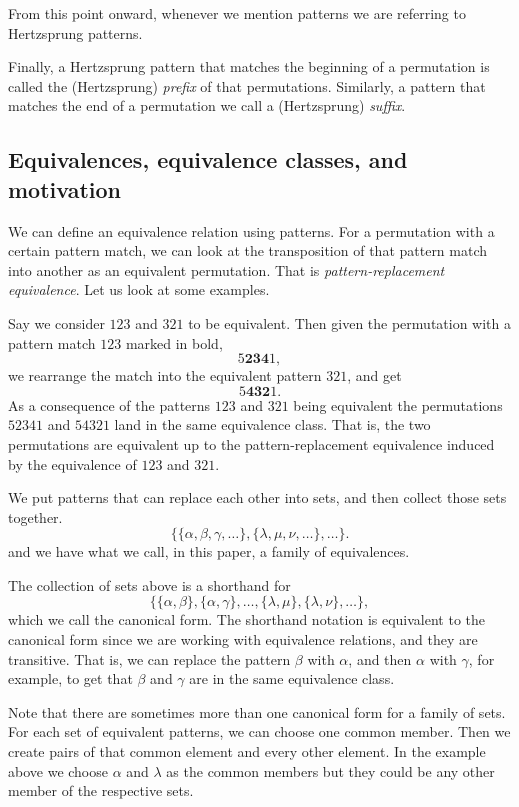 \documentclass[a4paper, 11pt, english]{article}
\theoremstyle{definition}
\begin{document}
From this point onward, whenever we mention patterns we are referring to
Hertzsprung patterns.

Finally, a Hertzsprung pattern that matches the beginning of a permutation is
called the (Hertzsprung) \emph{prefix} of that permutations. Similarly, a pattern
that matches the end of a permutation we call a (Hertzsprung) \emph{suffix}.

\subsection{Equivalences, equivalence classes, and motivation}
We can define an equivalence relation using patterns. For a permutation with a certain pattern
match, we can look at the transposition of that pattern match into another as an equivalent
permutation. That is \emph{pattern-replacement equivalence}. Let us look at some examples.

Say we consider $123$ and $321$ to be equivalent. Then given the
permutation with a pattern match $123$ marked in bold,
\[
  5\bm{234}1,
\]
we rearrange the match into the equivalent pattern $321$, and get
\[
  5\bm{432}1.
\]
As a consequence of the patterns $123$ and $321$ being equivalent the permutations $52341$ and
$54321$ land in the same equivalence class. That is, the two permutations are equivalent up to the
pattern-replacement equivalence induced by the equivalence of $123$ and $321$.

We put patterns that can replace each other into sets, and then collect those sets together. 
\[
    \{ \{\alpha, \beta, \gamma, \dots \}, \{\lambda, \mu, \nu, \dots \}, \dots
    \}.
\]
and we have what we call, in this paper, a family of equivalences.

The collection of sets above is a shorthand for
\[
    \{ \{ \alpha, \beta \}, \{ \alpha, \gamma \}, \dots, \{ \lambda, \mu \}, \{
        \lambda, \nu \}, \dots \},
\] 
which we call the canonical form. The shorthand notation is equivalent to the canonical form since
we are working with equivalence relations, and they are transitive.
That is, we can replace the pattern $\beta$ with $\alpha$, and then $\alpha$ with $\gamma$, for
example, to get that $\beta$ and $\gamma$ are in the same equivalence class.

Note that there are sometimes more than one canonical form for a family of sets. For each 
set of equivalent patterns, we can choose one common member. Then we create pairs of that common
element and every other element. In the example above we choose $\alpha$ and $\lambda$ as the common members
but they could be any other member of the respective sets.
\end{document}

